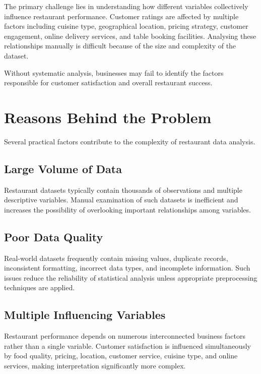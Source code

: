 \documentclass[12pt,a4paper]{report}
\begin{document}
The primary challenge lies in understanding how different variables collectively influence restaurant performance. Customer ratings are affected by multiple factors including cuisine type, geographical location, pricing strategy, customer engagement, online delivery services, and table booking facilities. Analysing these relationships manually is difficult because of the size and complexity of the dataset.

Without systematic analysis, businesses may fail to identify the factors responsible for customer satisfaction and overall restaurant success.


\section{Reasons Behind the Problem}

Several practical factors contribute to the complexity of restaurant data analysis.

\subsection{Large Volume of Data}

Restaurant datasets typically contain thousands of observations and multiple descriptive variables. Manual examination of such datasets is inefficient and increases the possibility of overlooking important relationships among variables.

\subsection{Poor Data Quality}

Real-world datasets frequently contain missing values, duplicate records, inconsistent formatting, incorrect data types, and incomplete information. Such issues reduce the reliability of statistical analysis unless appropriate preprocessing techniques are applied.

\subsection{Multiple Influencing Variables}

Restaurant performance depends on numerous interconnected business factors rather than a single variable. Customer satisfaction is influenced simultaneously by food quality, pricing, location, customer service, cuisine type, and online services, making interpretation significantly more complex.
\end{document}

